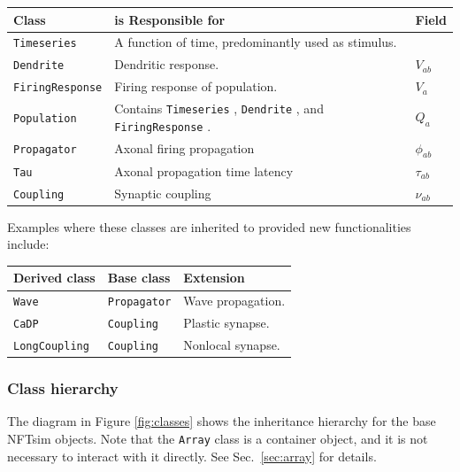 \documentclass[12pt,a4paper]{article}
\newcommand{\type}[1]{{\small\small\tt #1} }
\begin{document}
\begin{tabular}{l l l}
    Class&is Responsible for&Field\\
    \hline
    \type{Timeseries}&A function of time, predominantly used as stimulus.&\\
    \type{Dendrite}&Dendritic response.&$V_{ab}$\\
    \type{FiringResponse}&Firing response of population.&$V_a$\\
    \type{Population}&Contains \type{Timeseries}, \type{Dendrite}, and \type{FiringResponse}.&$Q_a$\\
    \type{Propagator}&Axonal firing propagation&$\phi_{ab}$\\
    \type{Tau}&Axonal propagation time latency&$\tau_{ab}$\\
    \type{Coupling}&Synaptic coupling&$\nu_{ab}$
\end{tabular}

Examples where these classes are inherited to provided new functionalities include:

\begin{tabular}{l l l}
    Derived class&Base class&Extension\\
    \hline
    \type{Wave}&\type{Propagator}&Wave propagation.\\
    \type{CaDP}&\type{Coupling}&Plastic synapse.\\
    \type{LongCoupling}&\type{Coupling}&Nonlocal synapse.
\end{tabular}

\subsubsection{Class hierarchy}
The diagram in Figure \ref{fig:classes} shows the inheritance hierarchy for the base NFTsim objects. Note that the \type{Array} class is a container object, and it is not necessary to interact with it directly. See Sec.~\ref{sec:array} for details.
\end{document}
